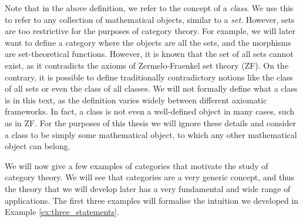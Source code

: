 \documentclass[../thesis.tex]{subfiles}
\begin{document}
Note that in the above definition, we refer to the concept of a \textit{class}.
We use this to refer to any collection of mathematical objects, similar to a \textit{set}.
However, sets are too restrictive for the purposes of category theory.
For example, we will later want to define a category where the objects are all the sets, and the morphisms are set-theoretical functions.
However, it is known that the set of all sets cannot exist, as it contradicts the axioms of Zermelo-Fraenkel set theory (ZF).
On the contrary, it is possible to define traditionally contradictory notions like the class of all sets or even the class of all classes.
We will not formally define what a class is in this text, as the definition varies widely between different axiomatic frameworks.
In fact, a class is not even a well-defined object in many cases, such as in ZF.
For the purposes of this thesis we will ignore these details and consider a class to be simply some mathematical object, to which any other mathematical object can belong.

We will now give a few examples of categories that motivate the study of category theory.
We will see that categories are a very generic concept, and thus the theory that we will develop later has a very fundamental and wide range of applications.
The first three examples will formalise the intuition we developed in Example \ref{ex:three_statements}.
\end{document}
